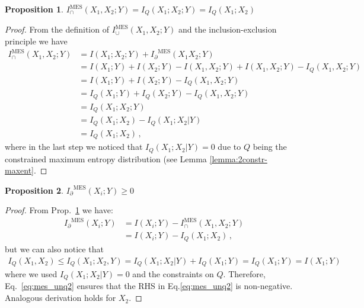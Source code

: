 \documentclass{article}
\newcommand{\Ip}{\ensuremath{I_\partial}\xspace}
\newcommand{\cxxy}{\ensuremath{(X_1;X_2;Y)}}
\newcommand{\IMES}{\ensuremath{I_\cap^{\text{MES}}}\xspace}
\newcommand{\IMESs}{\ensuremath{I_\cap^{\text{MES}}(X_1,X_2;Y)}\xspace}
\newtheorem{proposition}{Proposition}
\begin{document}
\begin{proposition} \label{prop:MES-redef}
    $\IMES(X_1,X_2;Y)=I_Q(X_1;X_2;Y)=I_Q(X_1;X_2)$
\end{proposition}
\begin{proof}
    From the definition of $I_\cup^{\text{MES}}(X_1,X_2;Y)$ and the inclusion-exclusion principle we have
    \begin{equation}
    \begin{aligned}
        \IMES(X_1,X_2;Y) & = I(X_1;X_2;Y) + \Ip^\text{MES}(X_1X_2;Y)  \\
        & = I(X_1;Y) + I(X_2;Y) - I(X_1,X_2;Y) + I(X_1,X_2;Y) - I_Q(X_1,X_2;Y) \\
        & = I(X_1;Y) + I(X_2;Y) - I_Q(X_1,X_2;Y) \\
        & = I_Q(X_1;Y) + I_Q(X_2;Y) - I_Q(X_1,X_2;Y) \\
        & = I_Q\cxxy \\
        & = I_Q(X_1;X_2) - I_Q(X_1;X_2|Y) \\
        & = I_Q(X_1;X_2) \,,
    \end{aligned}
    \end{equation}
    where in the last step we noticed that $I_Q(X_1;X_2|Y)=0$ due to $Q$ being the constrained maximum entropy distribution (see Lemma \ref{lemma:2constr-maxent}. 
\end{proof}


\begin{proposition}
    $\Ip^\text{MES}(X_i;Y)\ge0$ 
\end{proposition}
\begin{proof}
From Prop.~\ref{prop:MES-redef} we have:
\begin{equation} \label{eq:mes_unq1}
    \begin{aligned}
    \Ip^\text{MES}(X_i;Y) & = I(X_i;Y)- \IMESs \\
    & = I(X_i;Y)- I_Q(X_1;X_2) \,,
    \end{aligned}
\end{equation}
    but we can also notice that
    \begin{equation} \label{eq:mes_unq2}
        \begin{aligned}
            I_Q(X_1,X_2) \leq I_Q(X_1;X_2,Y)=I_Q(X_1;X_2|Y) + I_Q(X_1;Y) = I_Q(X_1;Y) = I(X_1;Y)
        \end{aligned}
    \end{equation}
    where we used $I_Q(X_1;X_2|Y)=0$ and the constraints on $Q$. Therefore, Eq.~\eqref{eq:mes_unq2} ensures that the RHS in Eq.\eqref{eq:mes_unq2} is non-negative.
    Analogous derivation holds for $X_2$.
\end{proof}
\end{document}
